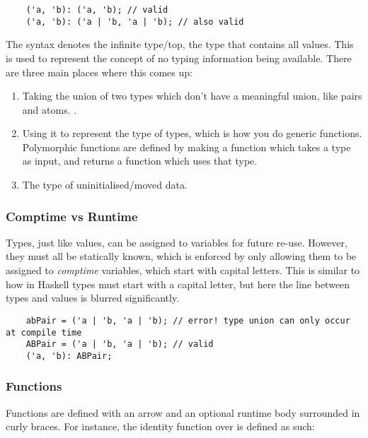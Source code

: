 \documentclass[12pt,twoside]{report}
\begin{document}
  \begin{verbatim}
    ('a, 'b): ('a, 'b); // valid
    ('a, 'b): ('a | 'b, 'a | 'b); // also valid
  \end{verbatim}

The \mono{*} syntax denotes the infinite type/top, the type that contains all values. This is used to represent the concept of no typing information being available. There are three main places where this comes up:

\begin{enumerate}
  \item Taking the union of two types which don't have a meaningful union, like pairs and atoms. .
  \item Using it to represent the type of types, which is how you do generic functions. Polymorphic functions are defined by making a function which takes a type as input, and returns a function which uses that type.
  \item The type of uninitialised/moved data.
\end{enumerate}

\subsubsection{Comptime vs Runtime}

Types, just like values, can be assigned to variables for future re-use. However, they must all be statically known, which is enforced by only allowing them to be assigned to \textit{comptime} variables, which start with capital letters. This is similar to how in Haskell types must start with a capital letter, but here the line between types and values is blurred significantly.

  \begin{verbatim}
    abPair = ('a | 'b, 'a | 'b); // error! type union can only occur at compile time
    ABPair = ('a | 'b, 'a | 'b); // valid
    ('a, 'b): ABPair;
  \end{verbatim}

\subsubsection{Functions}
Functions are defined with an arrow \mono{->} and an optional runtime body surrounded in curly braces. For instance, the identity function over  is defined as such:
\end{document}

